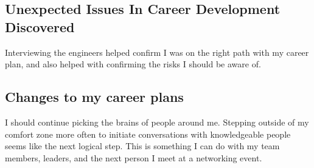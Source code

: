 \subsection{Unexpected Issues In Career Development Discovered}
Interviewing the engineers helped confirm I was on the right path with my
career plan, and also helped with confirming the risks I should be aware of.

\subsection{Changes to my career plans}
I should continue picking the brains of people around me. 
Stepping outside of my comfort zone more often to initiate conversations with knowledgeable people seems like the next logical step. This is something I can do with my team members, leaders, and the next person I meet at a networking event.
